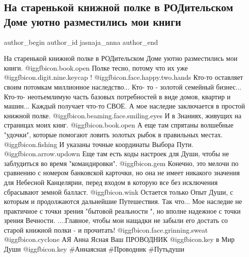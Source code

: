  
 
 
 
 
 
\subsection{На старенькой книжной полке в РОДительском Доме уютно разместились мои книги}
\label{sec:07_09_2021.fb.jasnaja_anna.1.knigi_roditelskij_dom}
 
\ifcmt
 author_begin
   author_id jasnaja_anna
 author_end
\fi

\obeycr
На старенькой книжной полке в РОДительском Доме уютно разместились мои книги. @igg{fbicon.book.open} 
Полке тесно, потому что их уже @igg{fbicon.digit.nine.keycap} ! @igg{fbicon.face.happy.two.hands} 
Кто-то оставляет своим потомкам миллионное наследство...
Кто- то - золотой семейный бизнес...
Кто-то- неотьемлимую часть базовых потребностей в виде домов, квартир и машин...
Каждый получает что-то СВОЕ. 
А мое наследие  заключается в простой книжной полке.  @igg{fbicon.beaming.face.smiling.eyes}   И в Знаниях, живущих на страницах моих книг. @igg{fbicon.book.open} 
А еще там спрятаны волшебные "удочки", которые помогают ловить золотых рыбок в правильных местах. @igg{fbicon.fishing} 
И указаны точные координаты Выбора Пути. @igg{fbicon.arrow.updown}
Еще там есть коды настроек для Души, чтобы не заблудиться во время "командировки". @igg{fbicon.gem} 
Конечно, это мелочи по сравнению с номером банковской карточки, но она не имеет никакого значения для Небесной Канцелярии, перед входом в которую все без исключения сбрасывают земной балласт. @igg{fbicon.wink} 
Остается только Опыт Души, с которым и  продолжаются дальнейшие Путешествия.
Так что... Мое наследие не практичное с точки зрения "бытовой реальности ", но вполне надежное с точки зрения Вечности.
....Главное, чтобы мои нащадки не забыли его достать со старой книжной полки - и прочитать! @igg{fbicon.face.grinning.sweat} 
 @igg{fbicon.cyclone} АЯ
Анна Ясная 
Ваш ПРОВОДНИК @igg{fbicon.key}  в Мир Души  @igg{fbicon.key} 
\#Аннаясная \#Проводник  \#Путьдуши
\restorecr

